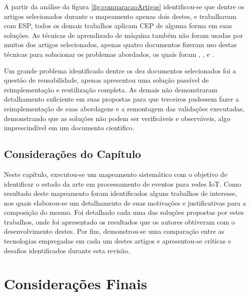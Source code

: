 \documentclass[ti,table]{texufpel} %
\begin{document}
  

  

A partir da análise da figura \ref{fig:comparacaoArtigos} identificou-se que dentre os artigos selecionados durante o mapeamento apenas dois destes, \cite{art1aslam2018towards} e \cite{art5chen2016dress} trabalhavam com ESP, todos os demais trabalhos aplicam CEP de alguma forma em suas soluções. As técnicas de aprendizado de máquina também não foram usadas por muitos dos artigos selecionados, apenas quatro documentos fizeram uso destas técnicas para solucionar os problemas abordados, os quais foram \cite{art1aslam2018towards}, \cite{art4akbar2017predictive}, \cite{art9kousiouris2018integrated} e \cite{art10soto2016ceml}.  

  

Um grande problema identificado dentre os dez documentos selecionados foi a questão de reusabilidade, apenas \cite{art2zimmerle2018web} apresentou uma solução passível de reimplementação e reutilização completa. As demais não demonstraram detalhamento suficiente em suas propostas para que terceiros pudessem  fazer a reimplementação de suas abordagens e a remontagem das validações executadas, demonstrando que as soluções não podem ser verificáveis e observáveis, algo imprescindível em um documento cientifico.  

  

\section{Considerações do Capítulo} 

  

Neste capítulo, executou-se um mapeamento sistemático com o objetivo de identificar o estado da arte em processamento de eventos para redes IoT. Como resultado deste mapeamento foram identificados alguns trabalhos de interesse, nos quais elaborou-se um detalhamento de suas motivações e justificativas para a composição do mesmo. Foi detalhado cada uma das soluções propostas por estes trabalhos, onde foi apresentado os resultados que os autores obtiveram com o desenvolvimento destes. Por fim, demonstrou-se uma comparação entre as tecnologias empregadas em cada um destes artigos e apresentou-se críticas e desafios identificados durante esta revisão.  

  


  

\chapter{Considerações Finais} 
\end{document}
